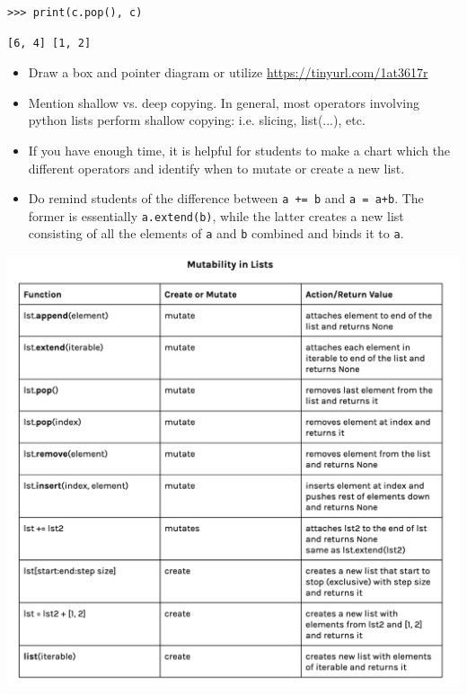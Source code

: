 \begin{blocksection}
\begin{lstlisting}
>>> print(c.pop(), c)
\end{lstlisting}
\begin{solution}[0.25in]
\begin{lstlisting}
[6, 4] [1, 2]
\end{lstlisting}
\end{solution}
\end{blocksection}

\begin{blocksection}
\begin{guide}
\begin{itemize}
	\item Draw a box and pointer diagram or utilize \url {https://tinyurl.com/1at3617r}
	\item Mention shallow vs. deep copying. In general, most operators involving python lists perform shallow copying: i.e. slicing, list(...), etc.
	\item If you have enough time, it is helpful for students to make a chart which the different operators and identify when to mutate or create a new list.
    \item Do remind students of the difference between \lstinline{a += b} and \lstinline{a = a+b}. The former is essentially \lstinline{a.extend(b)}, while the latter creates a new list consisting of all the elements of \lstinline{a} and \lstinline{b} combined and binds it to \lstinline{a}.
\end{itemize}
\includegraphics[width=.9\textwidth]{list-mutation.png}
\end{guide}
\end{blocksection}
